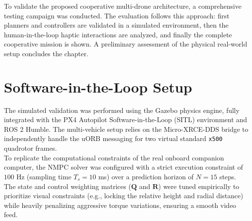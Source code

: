 \label{ch:results}
To validate the proposed cooperative multi-drone architecture, a comprehensive testing campaign was conducted. The evaluation follows this approach: first planners and controllers are validated in a simulated environment, then the human-in-the-loop haptic interactions are analyzed, and finally the complete cooperative mission is shown. A preliminary assessment of the physical real-world setup concludes the chapter.

\section{Software-in-the-Loop Setup}
The simulated validation was performed using the Gazebo physics engine, fully integrated with the PX4 Autopilot Software-in-the-Loop (SITL) environment and ROS 2 Humble. The multi-vehicle setup relies on the Micro-XRCE-DDS bridge to independently handle the uORB messaging for two virtual standard \texttt{x500} quadrotor frames. 
\\To replicate the computational constraints of the real onboard companion computer, the NMPC solver was configured with a strict execution constraint of $100$ Hz (sampling time $T_s = 10$ ms) over a prediction horizon of $N=15$ steps. The state and control weighting matrices ($\mathbf{Q}$ and $\mathbf{R}$) were tuned empirically to prioritize visual constraints (e.g., locking the relative height and radial distance) while heavily penalizing aggressive torque variations, ensuring a smooth video feed. 
